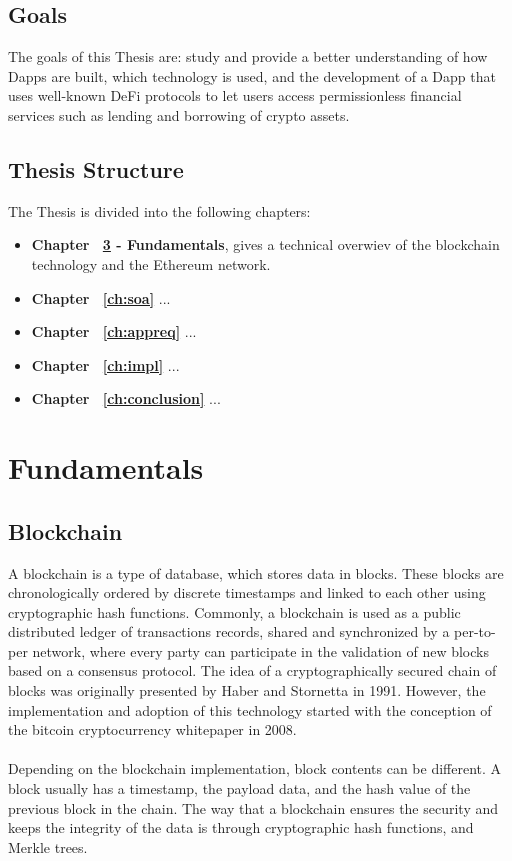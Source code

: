 \documentclass[11pt,a4paper]{report}
\begin{document}
\section{Goals}
The goals of this Thesis are:  study and provide a better understanding of how Dapps are built, which technology is used, and the development of a Dapp that uses well-known DeFi\cite{defi} protocols to let users access permissionless financial services such as lending and borrowing of crypto assets.

\section{Thesis Structure}
The Thesis is divided into the following chapters:
\begin{itemize}
	
	\item \textbf{Chapter ~\ref{ch:background} - Fundamentals}, gives a technical overwiev of the blockchain technology and the Ethereum network.
	\item \textbf{Chapter ~\ref{ch:soa}} ...
	\item \textbf{Chapter ~\ref{ch:appreq}} ...
	\item \textbf{Chapter ~\ref{ch:impl}} ...
	\item \textbf{Chapter ~\ref{ch:conclusion}} ...
\end{itemize}


\chapter{Fundamentals} \label{ch:background}

\section{Blockchain} \label{sec:bc}
A blockchain is a type of database, which stores data in blocks. These blocks are chronologically ordered by discrete timestamps and linked to each other using cryptographic hash functions. Commonly, a blockchain is used as a public distributed ledger of transactions records, shared and synchronized by a per-to-per network, where every party can participate in the validation of new blocks based on a consensus protocol.
The idea of a cryptographically secured chain of blocks was originally presented by Haber and Stornetta\cite{time-stamp} in 1991. However, the implementation and adoption of this technology started with the conception of the bitcoin cryptocurrency whitepaper\cite{bitcoin} in 2008. \\\\Depending on the blockchain implementation, block contents can be different. A block usually has a timestamp, the payload data, and the hash value of the previous block in the chain. The way that a blockchain ensures the security and keeps the integrity of the data is through cryptographic hash functions\cite{wiki:chf}, and Merkle trees\cite{merkle}.
\end{document}

